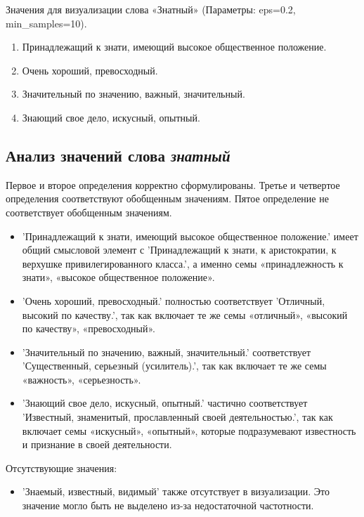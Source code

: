 Значения для визуализации слова «Знатный» (Параметры: eps=0.2, min\_samples=10).

\begin{enumerate}
    \item Принадлежащий к знати, имеющий высокое общественное положение.
    \item Очень хороший, превосходный.
    \item Значительный по значению, важный, значительный.
    \item Знающий свое дело, искусный, опытный.
\end{enumerate}

\subsection*{Анализ значений слова \textit{знатный}}

Первое и второе определения корректно сформулированы.
Третье и четвертое определения соответствуют обобщенным значениям.
Пятое определение не соответствует обобщенным значениям.

\begin{itemize}
    \item ’Принадлежащий к знати, имеющий высокое общественное положение.’ имеет общий смысловой элемент с
’Принадлежащий к знати, к аристократии, к верхушке привилегированного класса.’,
а именно семы «принадлежность к знати», «высокое общественное положение».

    \item ’Очень хороший, превосходный.’ полностью соответствует ’Отличный, высокий по качеству.’,
так как включает те же семы «отличный», «высокий по качеству», «превосходный».

    \item ’Значительный по значению, важный, значительный.’ соответствует
’Существенный, серьезный (усилитель).’, так как включает те же семы «важность», «серьезность».

    \item ’Знающий свое дело, искусный, опытный.’ частично соответствует
’Известный, знаменитый, прославленный своей деятельностью.’,
так как включает семы «искусный», «опытный», которые подразумевают известность и признание в своей деятельности.
\end{itemize}

Отсутствующие значения:
\begin{itemize}
    \item ’Знаемый, известный, видимый’ также отсутствует в визуализации.
Это значение могло быть не выделено из-за недостаточной частотности.
\end{itemize}

